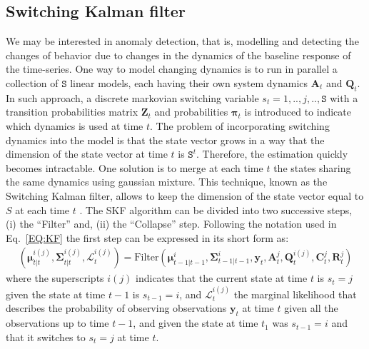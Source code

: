 \subsection{Switching Kalman filter}
\label{SS:THSKF}
We may be interested in anomaly detection, that is, modelling and detecting the changes of behavior due to changes in the dynamics of the baseline response of the time-series.
One way to model changing dynamics is to run in parallel a collection of ${\mathtt{S}}$ linear models, each having their own system dynamics $\mathbf{A}_{t}$ and $ \mathbf{Q}_{t}$.
In such approach, a discrete markovian switching variable $s_{t}= 1, ..,j,.. ,\mathtt{S}$ with a transition probabilities matrix $\mathbf{Z}_{t}$ and probabilities $\bm{\pi}_{t}$ is introduced to indicate which dynamics is used at time $t$.
The problem of incorporating switching dynamics into the model is that the state vector grows in a way that the dimension of the state vector at time $t$ is $\mathtt{S}^{t}$.
Therefore, the estimation quickly becomes intractable.
One solution is to merge at each time $t$ the states sharing the same dynamics using gaussian mixture.
This technique, known as the Switching Kalman filter, allows to keep the dimension of the state vector equal to $S$ at each time $t$ \cite{murphy2012machine}.
The SKF algorithm can be divided into two successive steps, (i) the ``Filter'' and, (ii) the ``Collapse'' step.
Following the notation used in Eq.~\ref{EQ:KF} the first step can be expressed in its short form as:
\begin{equation}
  \begin{split}
  (\bm{\mu}_{t|t}^{i(j)},\bm{\Sigma}_{t|t}^{i(j)}, \mathcal{L}_{t}^{i(j)}) = \text{Filter}(\bm{\mu}_{t-1|t-1}^{i},\bm{\Sigma}_{t-1|t-1}^{i}, \mathbf{y}_{t}, \mathbf{A}_{t}^{j},  \mathbf{Q}_{t}^{i(j)},   \mathbf{C}^{j}_{t},  \mathbf{R}^{j}_{t})
    \end{split}
\label{EQ:SKF1}
\end{equation}
where the superscripts $i(j)$ indicates that the current state at time $t$ is $s_{t}=j$ given the state at time $t-1$ is $s_{t-1}=i$, and
$ \mathcal{L}_{t}^{i(j)}$  the marginal likelihood that describes the probability of observing observations $\mathbf{y}_{t}$ at time $t$ given all the observations up to time $t-1$, and given the state at time $t_1$ was $s_{t-1} = i$ and that it switches to $s_{t} = j$ at time $t$.
